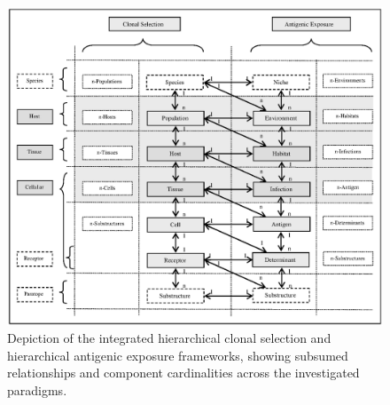 \begin{figure}[ht]
	\centering
	\includegraphics[scale=0.75]{framework/framework-integrated-cardinality}
	\caption{Depiction of the integrated hierarchical clonal selection and hierarchical antigenic exposure frameworks, showing subsumed relationships and component cardinalities across the investigated paradigms.}
	\label{fig:framework:ihcsf:cardinality}
\end{figure}

